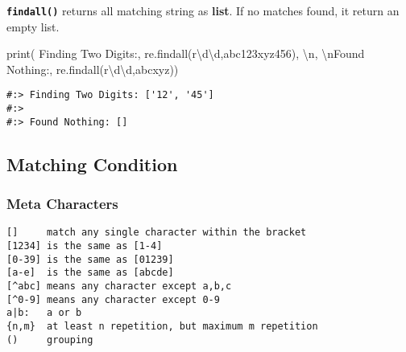 \documentclass[
]{book}
\newenvironment{Shaded}{\begin{snugshade}}{\end{snugshade}}
\newcommand{\BuiltInTok}[1]{#1}
\newcommand{\CharTok}[1]{\textcolor[rgb]{0.5,0.5,0.5}{#1}}
\newcommand{\NormalTok}[1]{#1}
\newcommand{\StringTok}[1]{\textcolor[rgb]{0.5,0.5,0.5}{#1}}
\newcommand{\VerbatimStringTok}[1]{\textcolor[rgb]{0.5,0.5,0.5}{#1}}
\begin{document}
\textbf{\texttt{findall()}} returns all matching string as \textbf{list}. If no matches found, it return an empty list.

\begin{Shaded}
\begin{Highlighting}[]
\BuiltInTok{print}\NormalTok{(}
  \StringTok{\textquotesingle{}Finding Two Digits:\textquotesingle{}}\NormalTok{,}
\NormalTok{  re.findall(}\VerbatimStringTok{r\textquotesingle{}\textbackslash{}d\textbackslash{}d\textquotesingle{}}\NormalTok{,}\StringTok{\textquotesingle{}abc123xyz456\textquotesingle{}}\NormalTok{), }\StringTok{\textquotesingle{}}\CharTok{\textbackslash{}n}\StringTok{\textquotesingle{}}\NormalTok{,}
  \StringTok{\textquotesingle{}}\CharTok{\textbackslash{}n}\StringTok{Found Nothing:\textquotesingle{}}\NormalTok{,}
\NormalTok{  re.findall(}\VerbatimStringTok{r\textquotesingle{}\textbackslash{}d\textbackslash{}d\textquotesingle{}}\NormalTok{,}\StringTok{\textquotesingle{}abcxyz\textquotesingle{}}\NormalTok{))}
\end{Highlighting}
\end{Shaded}

\begin{verbatim}
#:> Finding Two Digits: ['12', '45'] 
#:>  
#:> Found Nothing: []
\end{verbatim}

\hypertarget{matching-condition}{%
\subsection{Matching Condition}\label{matching-condition}}

\hypertarget{meta-characters}{%
\subsubsection{Meta Characters}\label{meta-characters}}

\begin{verbatim}
[]     match any single character within the bracket
[1234] is the same as [1-4]
[0-39] is the same as [01239]
[a-e]  is the same as [abcde]
[^abc] means any character except a,b,c
[^0-9] means any character except 0-9
a|b:   a or b
{n,m}  at least n repetition, but maximum m repetition
()     grouping
\end{verbatim}
\end{document}
